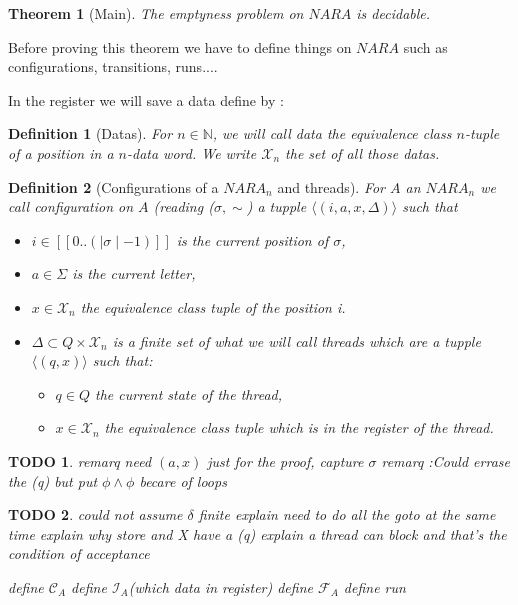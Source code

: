 \documentclass[a4paper,10pt]{report}
\newtheorem{thr}{Theorem} %
\newtheorem{df}{Definition}
\newtheorem{td}{TODO}
\newcommand{\seg}[1]{[\![#1]\!]}
\newcommand{\segw}[1]{\seg{0..(\mid #1\mid -1)}}
\newcommand{\C}{\mathcal{C}_{A}}
\newcommand{\I}{$\mathcal{I}_{A}$}
\newcommand{\F}{$\mathcal{F}_{A}$}
\newcommand{\X}{\mathcal{X}_{n}}
\begin{document}
\begin{thr}[Main]
  \label{main}
 The emptyness problem on $NARA$ is decidable.
\end{thr}


Before proving this theorem we have to define things on $NARA$ such as configurations, transitions, runs....


In the register we will save a data define by :  
\begin{df}[Datas]
  For $n\in \mathbb N$, we will call data the equivalence class $n$-tuple of a position in a $n$-data word.
  We write $\X$ the set of all those datas.
\end{df}

\begin{df}[Configurations of a $NARA_n$ and threads]
For $A$ an $NARA_n$ we call configuration on $A$ (reading ($\sigma,\sim$) a tupple  
 $\langle ( i,a ,x, \Delta  )  \rangle$
 such that 
  \begin{itemize}
    \item $i \in \segw{\sigma }$ is the current position of $\sigma$,
    \item $a \in \Sigma$ is the current letter, 
    \item $x\in  \X$ the equivalence class tuple of the position i.
    \item $\Delta \subset Q \times \X$ is a finite set of what we will call threads which are a tupple  
    $\langle (q,x)  \rangle$ such that:
      \begin{itemize}
	\item $q \in Q$ the current state of the thread,
	\item $x\in  \X $ the equivalence class tuple which is in the register of the thread.
      \end{itemize}
   \end{itemize}
\end{df}
\begin{td}
 remarq need $(a,x)$ just for the proof, capture $\sigma$
 remarq :Could errase the (q) but put $ \phi \wedge \phi$
 becare of loops
\end{td}


\begin{td}
could not assume $\delta$ finite
explain need to do all the goto at the same time
explain why store and X have a (q)
explain a thread can block and that's the condition of acceptance

  define $\C$ 
  define \I (which data in register)
  define \F
  define run

\end{td}
\end{document}
